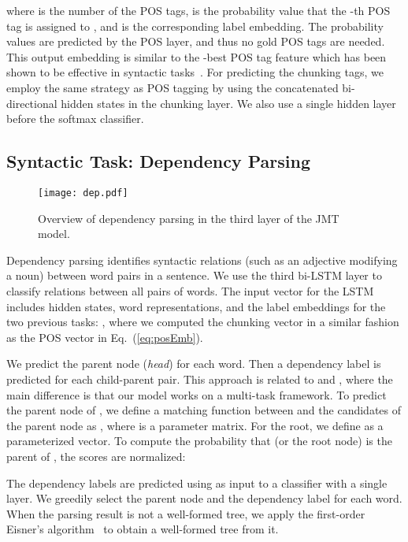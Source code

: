 \documentclass[11pt,a4paper]{article}
\begin{document}
where  is the number of the POS tags,  is the probability value that the -th POS tag is assigned to , and  is the corresponding label embedding.
The probability values are predicted by the POS layer, and thus no gold POS tags are needed.
This output embedding is similar to the -best POS tag feature which has been shown to be effective in syntactic tasks~\citep{andor2016,alberti2016}.
For predicting the chunking tags, we employ the same strategy as POS tagging by using the concatenated bi-directional hidden states  in the chunking layer. 
We also use a single  hidden layer before the softmax classifier.


\subsection{Syntactic Task: Dependency Parsing}
\begin{figure}[t]
	\begin{center}
    	\texttt{[image: dep.pdf]}
    \end{center}
\label{fig5}
\caption{Overview of dependency parsing in the third layer of the JMT model.}
\end{figure}
\fi
Dependency parsing identifies syntactic relations (such as an adjective modifying a noun) between word pairs in a sentence.
We use the third bi-LSTM layer to classify relations between all pairs of words.
The input vector for the LSTM includes hidden states, word representations, and the label embeddings for the two previous tasks:
, where we computed the chunking vector in a similar fashion as the POS vector in Eq.~(\ref{eq:posEmb}).

We predict the parent node ({\it head}) for each word.
Then a dependency label is predicted for each child-parent pair.
This approach is related to \citet{biaffine2017} and \citet{zhang2017head}, where the main difference is that our model works on a multi-task framework.
To predict the parent node of , we define a matching function between  and the candidates of the parent node as ,
where  is a parameter matrix.
For the root, we define  as a parameterized vector.
To compute the probability that  (or the root node) is the parent of , the scores are normalized:


The dependency labels are predicted using  as input to a  classifier with a single  layer.
We greedily select the parent node and the dependency label for each word.
When the parsing result is not a well-formed tree, we apply the first-order Eisner's algorithm~\citep{eisner1996} to obtain a well-formed tree from it.
\end{document}
